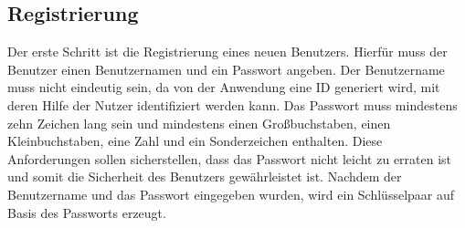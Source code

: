 \subsection{Registrierung}


Der erste Schritt ist die Registrierung eines neuen Benutzers. Hierfür muss der Benutzer einen Benutzernamen
und ein Passwort angeben. Der Benutzername muss nicht eindeutig sein, da von der Anwendung eine ID generiert wird, 
mit deren Hilfe der Nutzer identifiziert werden kann.
Das Passwort muss mindestens zehn Zeichen lang sein und mindestens einen Großbuchstaben, einen Kleinbuchstaben,
eine Zahl und ein Sonderzeichen enthalten. Diese Anforderungen sollen sicherstellen, dass das Passwort
nicht leicht zu erraten ist und somit die Sicherheit des Benutzers gewährleistet ist.
Nachdem der Benutzername und das Passwort eingegeben wurden, wird ein Schlüsselpaar auf 
Basis des Passworts erzeugt.


